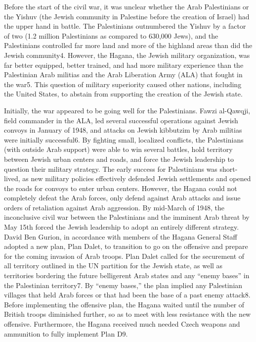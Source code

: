 \documentclass{turabian-researchpaper}
\begin{document}
Before the start of the civil war, it was unclear whether the Arab Palestinians or the Yishuv (the Jewish community in Palestine before the creation of Israel) had the upper hand in battle.  The Palestinians outnumbered the Yishuv by a factor of two (1.2 million Palestinians as compared to 630,000 Jews), and the Palestinians controlled far more land and more of the highland areas than did the Jewish community4.  However, the Hagana, the Jewish military organization, was far better equipped, better trained, and had more military experience than the Palestinian Arab militias and the Arab Liberation Army (ALA) that fought in the war5.  This question of military superiority caused other nations, including the United States, to abstain from supporting the creation of the Jewish state.

Initially, the war appeared to be going well for the Palestinians.  Fawzi al-Qawqji, field commander in the ALA, led several successful operations against Jewish convoys in January of 1948, and attacks on Jewish kibbutzim by Arab militias were initially successful6.  By fighting small, localized conflicts, the Palestinians (with outside Arab support) were able to win several battles, hold territory between Jewish urban centers and roads, and force the Jewish leadership to question their military strategy.  The early success for Palestinians was short-lived, as new military policies effectively defended Jewish settlements and opened the roads for convoys to enter urban centers.  However, the Hagana could not completely defeat the Arab forces, only defend against Arab attacks and issue orders of retaliation against Arab aggression.
By mid-March of 1948, the inconclusive civil war between the Palestinians and the imminent Arab threat by May 15th forced the Jewish leadership to adopt an entirely different strategy.  David Ben Gurion, in accordance with members of the Hagana General Staff adopted a new plan, Plan Dalet, to transition to go on the offensive and prepare for the coming invasion of Arab troops.  Plan Dalet called for the securement of all territory outlined in the UN partition for the Jewish state, as well as territories bordering the future belligerent Arab states and any “enemy bases” in the Palestinian territory7.  By “enemy bases,” the plan implied any Palestinian villages that held Arab forces or that had been the base of a past enemy attack8.  Before implementing the offensive plan, the Hagana waited until the number of British troops diminished further, so as to meet with less resistance with the new offensive.  Furthermore, the Hagana received much needed Czech weapons and ammunition to fully implement Plan D9.
\end{document}
